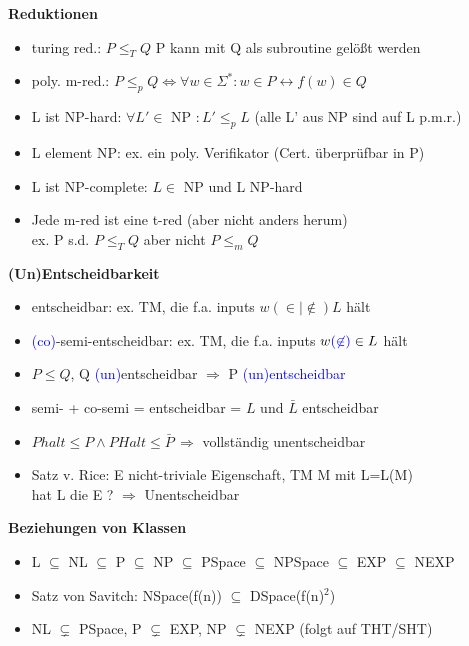 \documentclass[12pt,a4paper]{article}
\newcommand{\blue}[1]{\textcolor{blue} {#1}}
\begin{document}
\begin{paracol}{3}
\switchcolumn[0]
\centering
\textbf{Reduktionen}
\flushleft
\begin{itemize}
\setlength\itemsep{-0.5em}
\item turing red.: $P \leq_T Q$ P kann mit Q als subroutine gelößt werden
\item poly. m-red.: $ P \leq_p Q \Leftrightarrow \forall w \in \Sigma^*: w\in P \leftrightarrow f(w) \in Q$
\item L ist NP-hard: $\forall L' \in $ NP $: L' \leq_p L$ (alle L' aus NP sind auf L p.m.r.)
\item L element NP: ex. ein poly. Verifikator (Cert. überprüfbar in P)
\item L ist NP-complete: $L \in $ NP und L NP-hard
\item Jede m-red ist eine t-red (aber nicht anders herum)\\ex. P s.d. $P \leq_T Q$ aber nicht $P \leq_m Q$
\end{itemize}
\hspace{1cm}
\switchcolumn[1]
\centering
\textbf{(Un)Entscheidbarkeit}
\flushleft
\begin{itemize}
\setlength\itemsep{-0.5em}
\item entscheidbar: ex. TM, die f.a. inputs $w (\in | \not\in) L$ hält
\item \blue{(co)}-semi-entscheidbar: ex. TM, die f.a. inputs $w \blue{(\not\in)} \in  L$ hält
\item $P \leq Q$, Q \blue{(un)}entscheidbar $\Rightarrow$ P \blue{(un)entscheidbar}
\item semi- + co-semi = entscheidbar = $L$ und $\bar{L}$ entscheidbar
\item $Phalt \leq P \land PHalt \leq \bar{P}\, \Rightarrow$ vollständig unentscheidbar
\item Satz v. Rice: E nicht-triviale Eigenschaft, TM M mit L=L(M)\\hat L die E ? $\Rightarrow$ Unentscheidbar
\end{itemize}
\switchcolumn[2]
\centering
\textbf{Beziehungen von Klassen}
\flushleft
\begin{itemize}
\setlength\itemsep{-0.5em}
\item L $\subseteq$ NL $\subseteq$ P $\subseteq$ NP $\subseteq$ PSpace $\subseteq$ NPSpace $\subseteq$ EXP $\subseteq$ NEXP
\item Satz von Savitch: NSpace(f(n)) $\subseteq$ DSpace(f(n)$^2$)
\item NL $\subsetneq$ PSpace, P $\subsetneq$ EXP, NP $\subsetneq$ NEXP (folgt auf THT/SHT)

\end{itemize}
\end{paracol}
\end{document}
